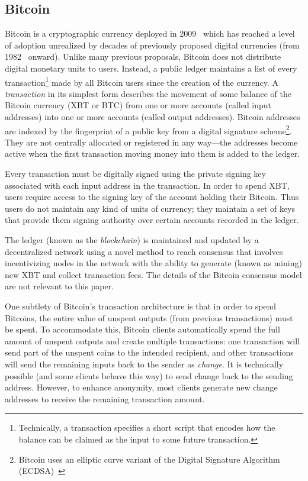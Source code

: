 \subsection{Bitcoin}
Bitcoin is a cryptographic currency deployed in 2009~\cite{Nak08} which has reached a level of adoption unrealized by decades of previously proposed digital currencies (from 1982~\cite{Cha82} onward). Unlike many previous proposals, Bitcoin does not distribute digital monetary units to users. Instead, a public ledger maintains a list of every transaction\footnote{Technically, a transaction specifies a short script that encodes how the balance can be claimed as the input to some future transaction.} made by all Bitcoin users since the creation of the currency. A \textit{transaction} in its simplest form describes the movement of some balance of the Bitcoin currency (XBT or BTC) from one or more accounts (called input addresses) into one or more accounts (called output addresses). Bitcoin addresses are indexed by the fingerprint of a public key from a digital signature scheme\footnote{Bitcoin uses an elliptic curve variant of the Digital Signature Algorithm (ECDSA)~\cite{ecdsa}}. They are not centrally allocated or registered in any way---the addresses become active when the first transaction moving money into them is added to the ledger. 

Every transaction must be digitally signed using the private signing key associated with each input address in the transaction. In order to spend XBT, users require access to the signing key of the account holding their Bitcoin. Thus users do not maintain any kind of units of currency; they maintain a set of keys that provide them signing authority over certain accounts recorded in the ledger. 

The ledger (known as the \emph{blockchain}) is maintained and updated by a decentralized network using a novel method to reach consensus that involves incentivizing nodes in the network with the ability to generate (known as mining) new XBT and collect transaction fees. The details of the Bitcoin consensus model are not relevant to this paper.

One subtlety of Bitcoin's transaction architecture is that in order to spend Bitcoins, the entire value of unspent outputs (\ie from previous transactions) must be spent. To accommodate this, Bitcoin clients automatically spend the full amount of unspent outputs and create multiple transactions: one transaction will send part of the unspent coins to the intended recipient, and other transactions will send the remaining inputs back to the sender as \emph{change}. It is technically possible (and some clients behave this way) to send change back to the sending address. However, to enhance anonymity, most clients generate new change addresses to receive the remaining transaction amount. 

